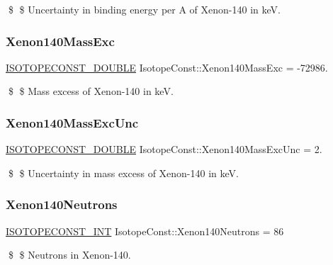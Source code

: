 \$ \$ Uncertainty in binding energy per A of Xenon-\/140 in keV. \mbox{\label{group___isotope_const-_xenon-_xe140_gaf837cb1bda6713e9c90e22e098ebf5ac}} 
\subsubsection{\texorpdfstring{Xenon140\+Mass\+Exc}{Xenon140MassExc}}
{\footnotesize\ttfamily \mbox{\hyperlink{group___isotope_const-_macros_ga8f45a7272ce02c0b4c65c44636ed719a}{I\+S\+O\+T\+O\+P\+E\+C\+O\+N\+S\+T\+\_\+\+D\+O\+U\+B\+LE}} Isotope\+Const\+::\+Xenon140\+Mass\+Exc = -\/72986.}

\$ \$ Mass excess of Xenon-\/140 in keV. \mbox{\label{group___isotope_const-_xenon-_xe140_gadc2ed7cc3b7696e94d18318dc0705363}} 
\subsubsection{\texorpdfstring{Xenon140\+Mass\+Exc\+Unc}{Xenon140MassExcUnc}}
{\footnotesize\ttfamily \mbox{\hyperlink{group___isotope_const-_macros_ga8f45a7272ce02c0b4c65c44636ed719a}{I\+S\+O\+T\+O\+P\+E\+C\+O\+N\+S\+T\+\_\+\+D\+O\+U\+B\+LE}} Isotope\+Const\+::\+Xenon140\+Mass\+Exc\+Unc = 2.}

\$ \$ Uncertainty in mass excess of Xenon-\/140 in keV. \mbox{\label{group___isotope_const-_xenon-_xe140_ga1985ed24e52ae0200d9dfe80c323749f}} 
\subsubsection{\texorpdfstring{Xenon140\+Neutrons}{Xenon140Neutrons}}
{\footnotesize\ttfamily \mbox{\hyperlink{group___isotope_const-_macros_ga5f18360b3e99483a35c32d789e62621c}{I\+S\+O\+T\+O\+P\+E\+C\+O\+N\+S\+T\+\_\+\+I\+NT}} Isotope\+Const\+::\+Xenon140\+Neutrons = 86}

\$ \$ Neutrons in Xenon-\/140. \mbox{\label{group___isotope_const-_xenon-_xe140_gaf4c73ea77cb4768ddca20debd21d473c}} 

